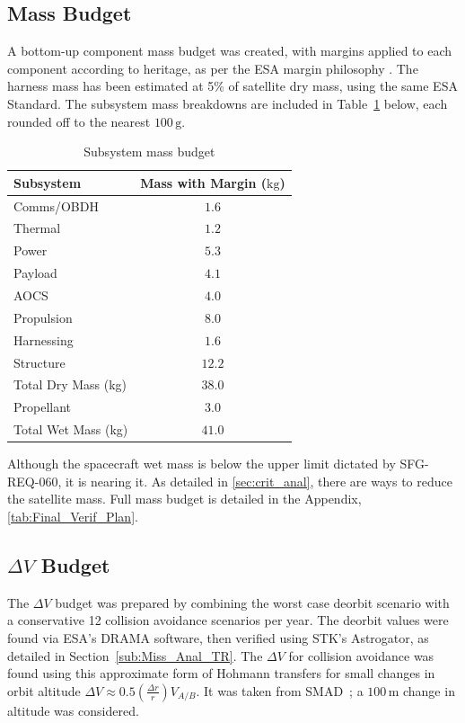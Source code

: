 \documentclass[a4paper, 11pt, conference]{IEEEtran}
\begin{document}
\subsection{Mass Budget}
A bottom-up component mass budget was created, with margins applied to each component according to heritage, as per the ESA margin philosophy \cite{noauthor_sre-pa2011097_2012}. The harness mass has been estimated at 5\% of satellite dry mass, using the same ESA Standard. The subsystem mass breakdowns are included in Table~\ref{tab:mass_budget} below, each rounded off to the nearest $100\,\mathrm{g}$. 
\begin{table}[!htbp]
\caption{Subsystem mass budget}
\label{tab:mass_budget}
\centering
\begin{tabular}{l c}
\toprule
\textbf{Subsystem} & \textbf{Mass with Margin ($\mathrm{kg}$)} \\
\midrule
Comms/OBDH              & $1.6$ \\
Thermal                 & $1.2$ \\
Power                   & $5.3$ \\
Payload                 & $4.1$ \\
AOCS                    & $4.0$ \\
Propulsion              & $8.0$ \\
Harnessing              & $1.6$ \\
Structure               & $12.2$ \\
\midrule
Total Dry Mass (kg)     & $38.0$ \\
\midrule
Propellant              & $3.0$ \\
\midrule
Total Wet Mass (kg)     & $41.0$ \\
\bottomrule
\end{tabular}
\end{table}

Although the spacecraft wet mass is below the upper limit dictated by SFG-REQ-060, it is nearing it. As detailed in \autoref{sec:crit_anal}, there are ways to reduce the satellite mass. Full  mass budget is detailed in the Appendix, \autoref{tab:Final_Verif_Plan}.

\subsection{$\Delta V$ Budget}\label{sub:deltav}
The $\Delta V$ budget was prepared by combining the worst case deorbit scenario with a conservative 12 collision avoidance scenarios per year. The deorbit values were found via ESA's DRAMA software, then verified using STK's Astrogator, as detailed in Section~\ref{sub:Miss_Anal_TR}. The $\Delta V$ for collision avoidance was found using this approximate form of Hohmann transfers for small changes in orbit altitude $ \Delta V \approx 0.5\left(\frac{\Delta r}{r}\right)V_{A/B}$. It was taken from SMAD~\cite{wertz_space_1999}; a $100\,\mathrm{m}$ change in altitude was considered.
\end{document}
